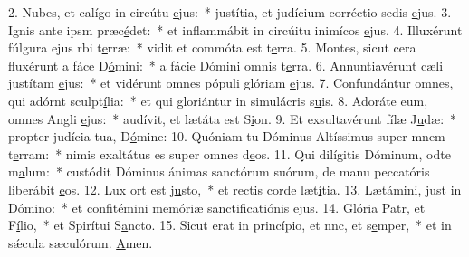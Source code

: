 2. Nubes, et calígo in circútu \uline{e}jus:~* justítia, et judícium corréctio sedis \uline{e}jus.
3. Ignis ante ipsm præc\uline{é}det:~* et inflammábit in circúitu inimícos \uline{e}jus.
4. Illuxérunt fúlgura ejus rbi t\uline{e}rræ:~* vidit et commóta est t\uline{e}rra.
5. Montes, sicut cera fluxérunt a fáce D\uline{ó}mini:~* a fácie Dómini omnis t\uline{e}rra.
6. Annuntiavérunt cæli justítam \uline{e}jus:~* et vidérunt omnes pópuli glóriam \uline{e}jus.
7. Confundántur omnes, qui adórnt sculpt\uline{í}lia:~* et qui gloriántur in simulácris s\uline{u}is.
8. Adoráte eum, omnes Angli \uline{e}jus:~* audívit, et lætáta est S\uline{i}on.
9. Et exsultavérunt fílæ J\uline{u}dæ:~* propter judícia tua, D\uline{ó}mine:
10. Quóniam tu Dóminus Altíssimus super mnem t\uline{e}rram:~* nimis exaltátus es super omnes d\uline{e}os.
11. Qui dilígitis Dóminum, odte m\uline{a}lum:~* custódit Dóminus ánimas sanctórum suórum, de manu peccatóris liberábit \uline{e}os.
12. Lux ort est j\uline{u}sto,~* et rectis corde læt\uline{í}tia.
13. Lætámini, just in D\uline{ó}mino:~* et confitémini memóriæ sanctificatiónis \uline{e}jus.
14. Glória Patr, et F\uline{í}lio,~* et Spirítui S\uline{a}ncto.
15. Sicut erat in princípio, et nnc, et s\uline{e}mper,~* et in sǽcula sæculórum. \uline{A}men.
